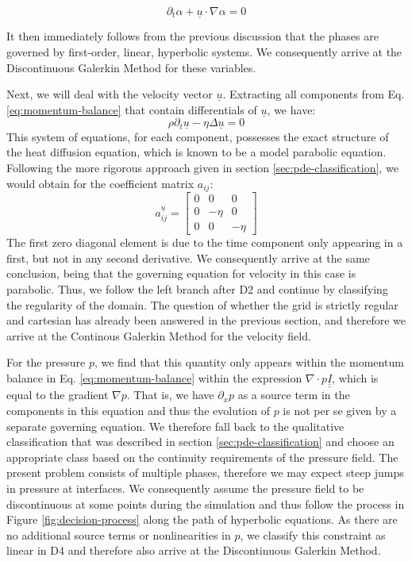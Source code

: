 \documentclass[asi,article,submit,moreauthors]{Definitions/mdpi}
\begin{document}
\begin{equation}
    \partial_t \alpha + \underline{u} \cdot \nabla \alpha = 0
\end{equation}

It then immediately follows from the previous discussion that the phases are governed by first-order, linear, hyperbolic systems.
We consequently arrive at the Discontinuous Galerkin Method for these variables.

Next, we will deal with the velocity vector $\underline{u}$.
Extracting all components from Eq. \ref{eq:momentum-balance} that contain differentials of $\underline{u}$, we have:
\begin{equation}
    \rho \partial_t \underline{u} - \eta \Delta \underline{u} = 0
\end{equation}
This system of equations, for each component, possesses the exact structure of the heat diffusion equation, which is known to be a model parabolic equation.
Following the more rigorous approach given in section \ref{sec:pde-classification}, we would obtain for the coefficient matrix $a_{ij}$:
\begin{equation}
    a_{ij}^{\underline{u}} = \begin{bmatrix}
        0 & 0 & 0 \\
        0 & -\eta & 0 \\
        0 & 0 & -\eta
    \end{bmatrix}
\end{equation}
The first zero diagonal element is due to the time component only appearing in a first, but not in any second derivative.
We consequently arrive at the same conclusion, being that the governing equation for velocity in this case is parabolic.
Thus, we follow the left branch after D2 and continue by classifying the regularity of the domain.
The question of whether the grid is strictly regular and cartesian has already been answered in the previous section, and therefore we arrive at the Continous Galerkin Method for the velocity field.

For the pressure $p$, we find that this quantity only appears within the momentum balance in Eq. \ref{eq:momentum-balance} within the expression $\nabla \cdot p\underline{\underline{I}}$, which is equal to the gradient $\nabla p$.
That is, we have $\partial_x p$ as a source term in the components in this equation and thus the evolution of $p$ is not per se given by a separate governing equation.
We therefore fall back to the qualitative classification that was described in section \ref{sec:pde-classification} and choose an appropriate class based on the continuity requirements of the pressure field.
The present problem consists of multiple phases, therefore we may expect steep jumps in pressure at interfaces.
We consequently assume the pressure field to be discontinuous at some points during the simulation and thus follow the process in Figure \ref{fig:decision-process} along the path of hyperbolic equations.
As there are no additional source terms or nonlinearities in $p$, we classify this constraint as linear in D4 and therefore also arrive at the Discontinuous Galerkin Method.
\end{document}
